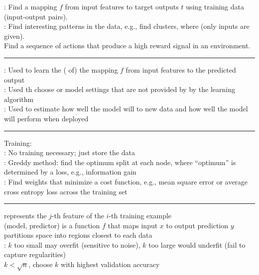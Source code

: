 \documentclass[10pt]{LatexTemplate/hw}
\begin{document}
\setlength{\abovedisplayskip}{0pt} %
\setlength{\belowdisplayskip}{0pt} %

\fontsize{9}{10}\selectfont

\begin{multicols*}{5}
: Find a mapping $f$ from input features  to target outputs $t$ using  training data (input-output pairs).\\
: Find interesting patterns in the data, e.g., find clusters, where  (only inputs are given).\\
 Find a sequence of actions that produce a high reward signal in an environment.\\
\rule{\linewidth}{0.4pt}
: Used to learn the ( of) the mapping $f$ from input features to the predicted output\\
: Used th choose  or model settings that are not provided by by the learning algorithm\\
: Used to estimate how well the model will  to new data and how well the model will perform when deployed\\
\rule{\linewidth}{0.4pt}
Training:\\
: No training necessary; just store the data \\
: Greddy method: find the optimum split at each node, where ``optimum'' is determined by a loss, e.g., information gain\\
: Find weights  that minimize a cost function, e.g., mean square error or average cross entropy loss across the training set\\
\rule{\linewidth}{0.4pt}
 represents the $j$-th feature of the $i$-th training example\\
 (model, predictor) is a function $f$ that maps input $x$ to output prediction $y$\\
 partitions space into regions closest to each data\\
: $k$ too small may overfit (sensitive to noise), $k$ too large would underfit (fail to capture regularities)\\
$k<\sqrt{n}$, choose $k$ with highest validation accuracy\\

\end{multicols*}
\end{document}
